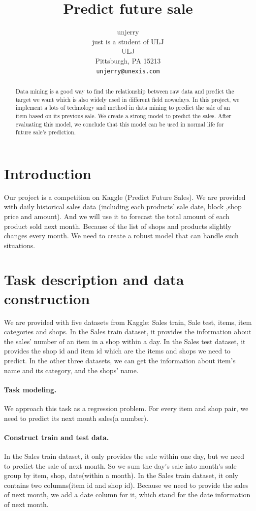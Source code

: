 \documentclass{article}
\title{Predict future sale}
\author{
  unjerry \\
  just is a student of ULJ\\
  ULJ\\
  Pittsburgh, PA 15213 \\
  \texttt{unjerry@unexis.com} \\
}
\begin{document}
\maketitle
\begin{abstract}
  Data mining is a good way to find the relationship between raw data and predict the target we want which is also widely used in different field nowadays. In this project, we implement a lots of technology and method in data mining to predict the sale of an item based on its previous sale. We create a strong model to predict the sales. After evaluating this model, we conclude that this model can be used in normal life for future sale’s prediction.
\end{abstract}




\section{Introduction}
Our project is a competition on Kaggle (Predict Future Sales). We are provided with daily historical sales data (including each products’ sale date, block ,shop price and amount). And we will use it to forecast the total amount of each product sold next month. Because of the list of shops and products slightly changes every month. We need to create a robust model that can handle such situations.


\section{Task description and data construction}
\label{sec:headings}
We are provided with five datasets from Kaggle: Sales train, Sale test, items, item categories and shops. In the Sales train dataset, it provides the information about the sales’ number of an item in a shop within a day. In the Sales test dataset, it provides the shop id and item id which are the items and shops we need to predict. In the other three datasets, we can get the information about item’s name and its category, and the shops’ name.
\paragraph{Task modeling.}
We approach this task as a regression problem. For every item and shop pair, we need to predict its next month sales(a number).
\paragraph{Construct train and test data.}
In the Sales train dataset, it only provides the sale within one day, but we need to predict the sale of next month. So we sum the day's sale into month's sale group by item, shop, date(within a month).
In the Sales train dataset, it only contains two columns(item id and shop id). Because we need to provide the sales of next month, we add a date column for it, which stand for the date information of next month.
\end{document}
